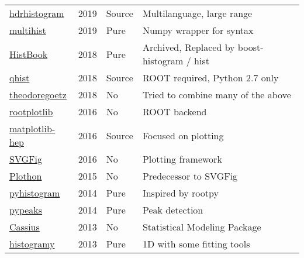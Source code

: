 \documentclass{webofc}
\begin{document}
\begin{table}
\begin{tabular}{llll}
		\href{https://pypi.org/project/hdrhistogram/}{hdrhistogram}                  & 2019         & Source & Multilanguage, large range                           \\
		\href{https://pypi.org/project/multihist/}{multihist}                        & 2019         & Pure   & Numpy wrapper for syntax                             \\
		\href{https://github.com/scikit-hep/histbook}{HistBook}                      & 2018         & Pure   & Archived, Replaced by boost-histogram / hist         \\
		\href{https://pypi.org/project/qhist/}{qhist}                                & 2018         & Source & ROOT required, Python 2.7 only                       \\
		\href{https://github.com/theodoregoetz/histogram}{theodoregoetz}             & 2018         & No     & Tried to combine many of the above                   \\
		\href{https://github.com/drdavis/rootplotlib}{rootplotlib}                   & 2016         & No     & ROOT backend                                         \\
		\href{https://pypi.org/project/matplotlib-hep/}{matplotlib-hep}              & 2016         & Source & Focused on plotting                                  \\
		\href{https://github.com/jpivarski/svgfig}{SVGFig}                           & 2016         & No     & Plotting framework                                   \\
		\href{https://github.com/jpivarski/plothon}{Plothon}                         & 2015         & No     & Predecessor to SVGFig                                \\
		\href{https://pypi.org/project/pyhistogram/}{pyhistogram}                    & 2014         & Pure   & Inspired by rootpy                                   \\
		\href{https://pypi.org/project/pypeaks}{pypeaks}                             & 2014         & Pure   & Peak detection                                       \\
		\href{https://github.com/opendatagroup/cassius}{Cassius}                     & 2013         & No     & Statistical Modeling Package                         \\
		\href{https://pypi.org/project/histogramy}{histogramy}                       & 2013         & Pure   & 1D with some fitting tools                           \\

\end{tabular}
\end{table}
\end{document}
